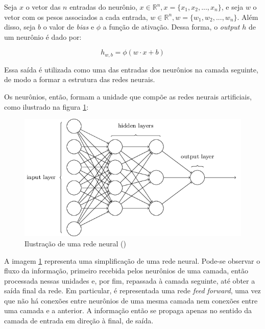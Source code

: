 

Seja $x$ o vetor das $n$ entradas do neurônio,
$x \in \mathbb{R}^n, x=\{x_1, x_2, ..., x_n\}$, e seja 
$w$ o vetor com os pesos associados a cada entrada, 
$w \in \mathbb{R}^n, w=\{w_1, w_2, ..., w_n\}$. Além disso,
seja $b$ o valor de \textit{bias} e $\phi$ a função de ativação.
Dessa forma, o \textit{output} $h$ de um neurônio é dado por:
 
\begin{equation}
  h_{w,b} = \phi(w \cdot x + b)
\end{equation}

Essa saída é utilizada como uma das entradas dos neurônios
na camada seguinte, de modo a formar a estrutura das redes 
neurais. 

Os neurônios,
então, formam a unidade que compõe as redes neurais artificiais,
como ilustrado na figura \ref{fig:redeneural}:

\begin{figure}[H] 
  \includegraphics[width= 12cm]{../figuras/redes/rede_mlp.png}
  \caption{Ilustração de uma rede neural (\cite{neuralnetworksanddeeplearning})}
  \label{fig:redeneural}
\end{figure}

A imagem \ref{fig:redeneural} representa uma simplificação de uma 
rede neural. Pode-se observar o fluxo da informação, primeiro recebida pelos 
neurônios de uma camada, então processada nessas unidades e, por fim, repassada à camada 
seguinte, até obter a saída final da rede. Em particular, é representada uma
rede \textit{feed forward}, uma vez que não há conexões entre neurônios de uma 
mesma camada nem conexões entre uma camada e a anterior. A informação então 
se propaga apenas no sentido da camada de entrada em direção à final, de saída.

